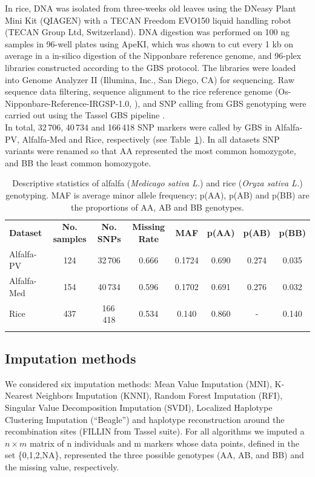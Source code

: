 In rice, DNA was isolated from three-weeks old leaves using the DNeasy Plant Mini Kit (QIAGEN) with a TECAN Freedom EVO150 liquid handling robot (TECAN Group Ltd, Switzerland). DNA digestion was performed on 100 ng samples in 96-well plates using ApeKI, which was shown to cut every 1 kb on average in a in-silico digestion of the Nipponbare reference genome, and 96-plex libraries constructed according to the GBS protocol. The libraries were loaded into Genome Analyzer II (Illumina, Inc., San Diego, CA) for sequencing. Raw sequence data filtering, sequence alignment to the rice reference genome (Os-Nipponbare-Reference-IRGSP-1.0, \cite{kawahara_improvement_2013}), and SNP calling from GBS genotyping were carried out using the Tassel GBS pipeline \cite{glaubitz_tassel-gbs:_2014}.\\
In total, 32\,706, 40\,734 and 166\,418 SNP markers were called by GBS in Alfalfa-PV, Alfalfa-Med and Rice, respectively (see Table~\ref{tab:descriptive_statistics}). In all datasets SNP variants were renamed so that AA represented the most common homozygote, and BB the least common homozygote.

\makeatletter{}\begin{table}
\centering
\caption[Descriptive statistics]{
Descriptive statistics of alfalfa (\emph{Medicago sativa L.}) 
and rice (\emph{Oryza sativa L.}) genotyping. MAF is average minor allele frequency; 
p(AA), p(AB) and p(BB) are the proportions of AA, AB and BB genotypes.}
\label{tab:descriptive_statistics}
\begin{tabular}{lccccccc}
\hline\noalign{\smallskip}
\noalign{\smallskip}\hline\noalign{\smallskip}
\textbf{Dataset} & \textbf{No. samples} & \textbf{No. SNPs} & \textbf{Missing Rate} & \textbf{MAF} & \textbf{p(AA)} & \textbf{p(AB)} & \textbf{p(BB)}\\
\noalign{\smallskip}\Xhline{3\arrayrulewidth}\noalign{\smallskip}
Alfalfa-PV & 124 & 32\,706 & 0.666 & 0.1724 & 0.690 & 0.274 & 0.035\\
Alfalfa-Med & 154 & 40\,734 & 0.596 & 0.1702 & 0.691 & 0.276 & 0.032\\
Rice & 437 & 166\,418 & 0.534 & 0.140 & 0.860 & - & 0.140 \\
\noalign{\smallskip}\hline
\end{tabular}
\end{table}
 

\subsection{Imputation methods}
\label{sec:imputation_methods}
We considered six imputation methods: Mean Value Imputation (MNI), K-Nearest Neighbors Imputation (KNNI), Random Forest Imputation (RFI), Singular Value Decomposition Imputation (SVDI), Localized Haplotype Clustering Imputation (``Beagle'') and haplotype reconstruction around the recombination sites (FILLIN from Tassel suite). For all algorithms we imputed a $n\times m$ matrix of n individuals and m markers whose data points, defined in the set \{0,1,2,NA\}, represented the three possible genotypes (AA, AB, and BB) and the missing value, respectively. 
